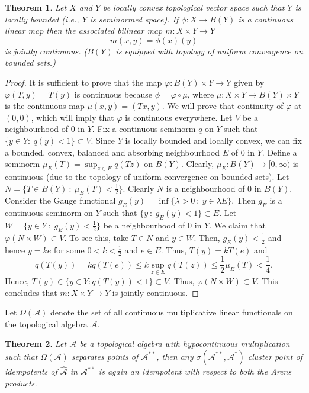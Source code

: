 \documentclass[10pt]{article}
\newtheorem{theorem}{Theorem}[section]
\theoremstyle{definition}
\begin{document}
	\begin{theorem}
		Let $X$ and $Y$ be locally convex topological vector space such that $Y$ is locally bounded (i.e., $Y$ is seminormed space). If $\phi:X\to B(Y)$ is a continuous linear map then the associated bilinear map $m:X\times Y\to Y$ $$m(x,y)=\phi(x)(y)$$is jointly continuous. ($B(Y)$ is equipped with topology of uniform convergence on bounded sets.)
	\end{theorem}
	\begin{proof}
		It is sufficient to prove that the map $\varphi:B(Y)\times Y\to Y$ given by $\varphi(T,y)=T(y)$ is continuous because $\phi=\varphi\circ \mu$, where $\mu:X\times Y\to B(Y)\times Y$ is the continuous map $\mu(x,y)=(Tx,y)$. We will prove that continuity of $\varphi$ at $(0,0)$, which will imply that $\varphi$ is continuous everywhere.  Let $V$ be a neighbourhood of $0$ in $Y$. Fix a continuous seminorm $q$ on $Y$ such that $\{y\in Y:~q(y)<1\}\subset V$. Since $Y$ is locally bounded and locally convex, we can fix a bounded, convex, balanced and absorbing neighbourhood $E$ of $0$ in $Y$. Define a seminorm $\mu_E(T)=\sup_{z\in E}q(Tz)$ on $B(Y)$. Clearly, $\mu_E:B(Y)\to [0,\infty)$ is continuous (due to the topology of uniform convergence on bounded sets). Let $N=\{T\in B(Y)~:~\mu_E(T)<\frac{1}{2}\}$. Clearly $N$ is a neighbourhood of $0$ in $B(Y)$. Consider the Gauge functional $g_E(y)=\inf\{\lambda>0~:~y\in \lambda E\}$. Then $g_E$ is a continuous seminorm on $Y$ such that $\{y~:~g_E(y)<1\}\subset E$. Let $W=\{y\in Y~:~g_E(y)<\frac{1}{2}\}$ be a neighbourhood of $0$ in $Y$. We claim that $\varphi (N\times W)\subset V$. To see this, take $T\in N$ and $y\in W$. Then, $g_E(y)<\frac{1}{2}$ and hence $y= ke$ for some $0<k<\frac{1}{2}$ and $e\in E$. Thus, $T(y)=kT(e)$ and $$q(T(y))=kq(T(e))\leq k\sup_{z\in E}q(T(z))\leq\frac{1}{2}\mu_E(T)<\frac{1}{4}.$$ Hence, $T(y)\in \{y\in Y:q(T(y))<1\}\subset V$. Thus, $\varphi(N\times W)\subset V$. This concludes that $m:X\times Y\to Y$ is jointly continuous.
	\end{proof}
	Let $\Omega(\mathcal A)$ denote the set of all continuous multiplicative linear functionals on the topological algebra $\mathcal A$.
	\begin{theorem}
		Let $\mathcal A$ be a topological algebra with hypocontinuous multiplication such that $\Omega(\mathcal A)$ separates points of $\mathcal A^{**}$, then any $\sigma(\mathcal A^{**},\mathcal A^*)$ cluster point of idempotents of $\hat{\mathcal A}$ in $\mathcal A^{**}$ is again an idempotent with respect to both the Arens products.
	\end{theorem}
\end{document}
